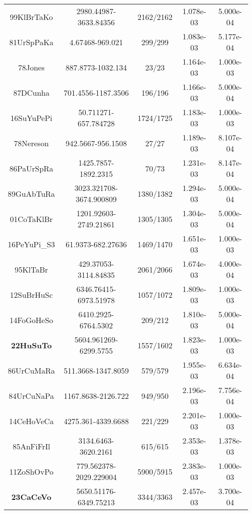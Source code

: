\begin{longtable}{c c c c c}
    99KlBrTaKo \cite{99KlBrTaKo} & 2980.44987-3633.84356 & 2162/2162 & 1.078e-03 & 5.000e-04 \\
    81UrSpPaKa \cite{81UrSpPaKa} & 4.67468-969.021 & 299/299 & 1.083e-03 & 5.177e-04 \\
    78Jones \cite{78Jones} & 887.8773-1032.134 & 23/23 & 1.164e-03 & 1.000e-03 \\
    87DCunha \cite{87DCunha} & 701.4556-1187.3506 & 196/196 & 1.166e-03 & 5.000e-04 \\
    16SuYuPePi \cite{16SuYuPePi} & 50.711271-657.784728 & 1724/1725 & 1.183e-03 & 1.000e-03 \\
    78Nereson \cite{78Nereson} & 942.5667-956.1508 & 27/27 & 1.189e-03 & 8.107e-04 \\
    86PaUrSpRa \cite{86PaUrSpRa} & 1425.7857-1892.2315 & 70/73 & 1.231e-03 & 8.147e-04 \\
    89GuAbTuRa \cite{89GuAbTuRa} & 3023.321708-3674.900809 & 1380/1382 & 1.294e-03 & 5.000e-04 \\
    01CoTaKlBr \cite{01CoTaKlBr} & 1201.92603-2749.21861 & 1305/1305 & 1.304e-03 & 5.000e-04 \\
    16PeYuPi\_S3 \cite{16PeYuPi} & 61.9373-682.27636 & 1469/1470 & 1.651e-03 & 1.000e-03 \\
    95KlTaBr \cite{95KlTaBr} & 429.37053-3114.84835 & 2061/2066 & 1.674e-03 & 4.000e-04 \\
    12SuBrHuSc \cite{12SuBrHuSc} & 6346.76415-6973.51978 & 1057/1072 & 1.809e-03 & 1.000e-03 \\
    14FoGoHeSo \cite{14FoGoHeSo} & 6410.2925-6764.5302 & 209/212 & 1.810e-03 & 5.000e-04 \\
    \textbf{22HuSuTo} \cite{22HuSuTo} & 5604.961269-6299.5755 & 1557/1602 & 1.823e-03 & 1.000e-03 \\
    86UrCuMaRa \cite{86UrCuMaRa} & 511.3668-1347.8059 & 579/579 & 1.955e-03 & 6.634e-04 \\
    84UrCuNaPa \cite{84UrCuNaPa} & 1167.8638-2126.722 & 949/950 & 2.196e-03 & 7.756e-04 \\
    14CeHoVeCa \cite{14CeHoVeCa} & 4275.361-4339.6688 & 221/229 & 2.201e-03 & 1.000e-03 \\
    85AnFiFrIl \cite{85AnFiFrIl} & 3134.6463-3620.2161 & 615/615 & 2.353e-03 & 1.378e-03 \\
    11ZoShOvPo \cite{11ZoShOvPo} & 779.562378-2029.229004 & 5900/5915 & 2.383e-03 & 1.000e-03 \\
    \textbf{23CaCeVo} \cite{23CaCeVo} & 5650.51176-6349.75213 & 3344/3363 & 2.457e-03 & 3.700e-04 \\

\end{longtable}
